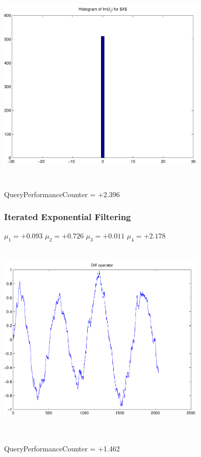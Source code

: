 \documentclass[9pt]{article}
\theoremstyle{plain}
\theoremstyle{definition}
\theoremstyle{remark}
\numberwithin{equation}{section}
\begin{document}
\includegraphics[width=10.0cm,height=10.0cm]{Im_lambda_n.pdf}

QueryPerformanceCounter  =  +2.396
\subsubsection{Iterated Exponential Filtering }
$\mu_1 =+0.093$
$\mu_2 =+0.726$
$\mu_3 =+0.011$
$\mu_4 =+2.178$
\includegraphics[width=10.0cm,height=10.0cm]{DIFF.pdf}

QueryPerformanceCounter  =  +1.462
\end{document}
